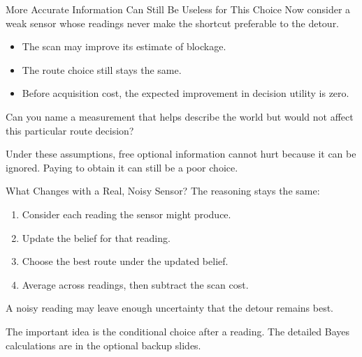 \documentclass[aspectratio=169,10pt]{beamer}
\begin{document}
\begin{frame}{More Accurate Information Can Still Be Useless for This Choice}
  Now consider a weak sensor whose readings never make the shortcut preferable to the detour.
  \begin{itemize}
    \item The scan may improve its estimate of blockage.
    \item The route choice still stays the same.
    \item Before acquisition cost, the expected improvement in decision utility is zero.
  \end{itemize}
  \begin{activity}
    Can you name a measurement that helps describe the world but would not affect this particular route decision?
  \end{activity}
  \begin{keyidea}
    Under these assumptions, free optional information cannot hurt because it can be ignored. Paying to obtain it can still be a poor choice.
  \end{keyidea}
\end{frame}

\begin{frame}{What Changes with a Real, Noisy Sensor?}
  The reasoning stays the same:
  \begin{enumerate}
    \item Consider each reading the sensor might produce.
    \item Update the belief for that reading.
    \item Choose the best route under the updated belief.
    \item Average across readings, then subtract the scan cost.
  \end{enumerate}
  A noisy reading may leave enough uncertainty that the detour remains best.
  \begin{keyidea}
    The important idea is the conditional choice after a reading. The detailed Bayes calculations are in the optional backup slides.
  \end{keyidea}
\end{frame}
\end{document}
